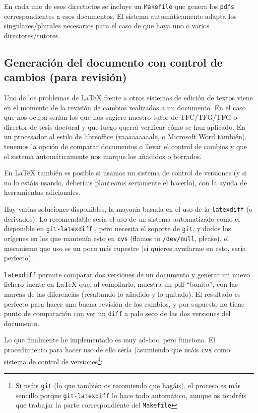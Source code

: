 \documentclass[spanish,openright]{book}
\begin{document}
En cada uno de esos directorios se incluye un \texttt{Makefile} que
genera los \texttt{pdfs} correspondientes a esos documentos. El
sistema automáticamente adapta los singulares/plurales necesarios para
el caso de que haya uno o varios directores/tutores.


\subsection{Generación del documento con control de cambios (para
  revisión)}
\label{sec:control-de-cambios}

Uno de los problemas de \LaTeX{} frente a otros sistemas de edición de
textos viene en el momento de la revisión de cambios realizados a un
documento. En el caso que nos ocupa serían los que nos sugiere nuestro
tutor de TFC/TFG/TFG o director de tesis doctoral y que luego querrá
verificar cómo se han aplicado. En un procesador al estilo de
libreoffice (vaaaaaaaaale, o Microsoft Word también), tenemos la opción
de comparar documentos o llevar el control de cambios y que el sistema
automáticamente nos marque los añadidos o borrados. 

En \LaTeX{} también es posible si usamos un sistema de control de
versiones (y si no lo estáis usando, deberíais plantearos seriamente el
hacerlo), con la ayuda de herramientas adicionales.

Hay varias soluciones disponibles, la mayoría basada en el uso de la
\texttt{latexdiff} \cite{latexdiff} (o derivados). Lo recomendable
sería el uso de un sistema automatizado como el disponible en
\texttt{git-latexdiff} \cite{git-latexdiff}, pero necesita el soporte
de \texttt{git}, y dados los orígenes en los que mantenía esto en
\texttt{cvs} (flames to \texttt{/dev/null}, please), el mecanismo que
uso es un poco más rupestre (si quieres ayudarme en esto, sería
perfecto).

\texttt{latexdiff} permite comparar dos versiones de un documento y
generar un nuevo fichero fuente en \LaTeX{} que, al compilarlo, muestra un
pdf ``bonito'', con las marcas de las diferencias (resaltando lo añadido
y lo quitado). El resultado es perfecto para hacer una buena revisión de
los cambios, y por supuesto no tiene punto de comparación con ver un
\texttt{diff} a palo seco de las dos versiones del documento. 

Lo que finalmente he implementado es muy ad-hoc, pero funciona. El
procedimiento para hacer uso de ello sería (asumiendo que usáis
\texttt{cvs} como sistema de control de versiones\footnote{Si usáis
  \texttt{git} (lo que también os recomiendo que hagáis), el proceso es
  más sencillo porque \texttt{git-latexdiff} lo hace todo automático,
  aunque os tendréis que trabajar la parte correspondiente del
  \texttt{Makefile}}:
\end{document}
